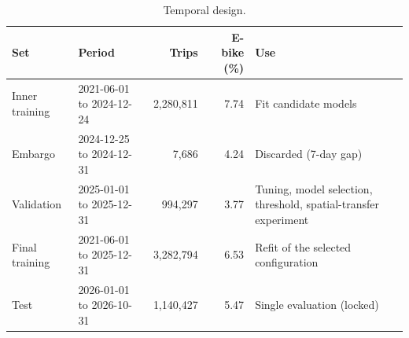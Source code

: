 \begin{table}[!htbp]
\centering
\small
\caption{Temporal design.}
\label{tab:split}
\begin{tabularx}{\linewidth}{llrrL}
\toprule
Set & Period & Trips & E-bike (\%) & Use \\
\midrule
Inner training & 2021-06-01 to 2024-12-24 & 2,280,811 & 7.74 & Fit candidate models \\
Embargo & 2024-12-25 to 2024-12-31 & 7,686 & 4.24 & Discarded (7-day gap) \\
Validation & 2025-01-01 to 2025-12-31 & 994,297 & 3.77 & Tuning, model selection, threshold, spatial-transfer experiment \\
Final training & 2021-06-01 to 2025-12-31 & 3,282,794 & 6.53 & Refit of the selected configuration \\
Test & 2026-01-01 to 2026-10-31 & 1,140,427 & 5.47 & Single evaluation (locked) \\
\bottomrule
\end{tabularx}
\end{table}
